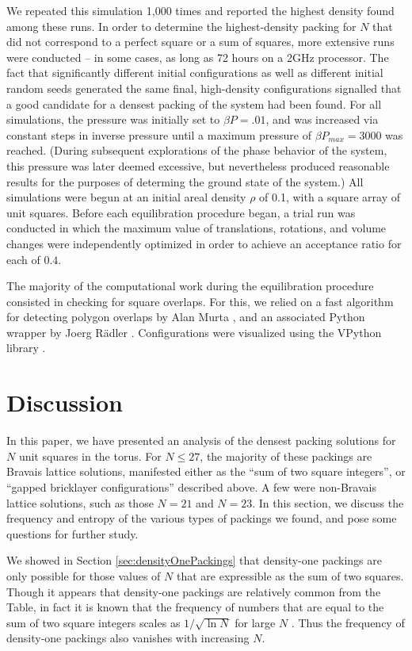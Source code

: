 \documentclass{umthesis}          %
\begin{document}
We repeated this simulation 1,000 times and reported the highest density found among these runs.  In order to determine the highest-density packing for $N$ that did not correspond to a perfect square or a sum of squares, more extensive runs were conducted -- in some cases, as long as 72 hours on a 2GHz processor.  The fact that significantly different initial configurations as well as different initial random seeds generated the same final, high-density configurations signalled that a good candidate for a densest packing of the system had been found.  For all simulations, the pressure was initially set to $\beta P=.01$, and was increased via constant steps in inverse pressure until a maximum pressure of $\beta P_{max}=3000$ was reached. (During subsequent explorations of the phase behavior of the system, this pressure was later deemed excessive, but nevertheless produced reasonable results for the purposes of determing the ground state of the system.) All simulations were begun at an initial areal density $\rho$ of 0.1, with a square array of unit squares. Before each equilibration procedure began, a trial run was conducted in which the maximum value of translations, rotations, and volume changes were independently optimized in order to achieve an acceptance ratio for each of $0.4$. 

The majority of the computational work during the equilibration procedure consisted in checking for square overlaps.  For this, we relied on a fast algorithm for detecting polygon overlaps by Alan Murta \cite{Murta}, and an associated Python wrapper by Joerg R\"adler \cite{Radler}. Configurations were visualized using the VPython library \cite{Scherer2000}.


\section{Discussion}
\label{sec:discussion}

In this paper, we have presented an analysis of the densest packing solutions for $N$ unit squares in the torus.  For $N \leq 27$, the majority of these packings are Bravais lattice solutions, manifested either as the ``sum of two square integers'', or ``gapped bricklayer configurations'' described above. A few were non-Bravais lattice solutions, such as those $N=21$ and $N=23$. In this section, we discuss the frequency and entropy of the various types of packings we found, and pose some questions for further study.

We showed in Section \ref{sec:densityOnePackings} that density-one packings are only possible for those values of $N$ that are expressible as the sum of two squares. 
Though it appears that density-one packings are relatively common from the Table, in fact it is known that the frequency of numbers that are equal to the sum of two square integers scales as $1/\sqrt{\ln N}$ for large $N$ \cite{Berndt1993,Landau1909}.
Thus the frequency of density-one packings also vanishes with increasing $N$.
\end{document}
